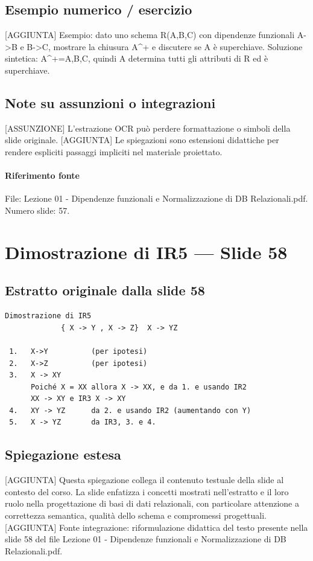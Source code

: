 \documentclass[11pt]{article}
\begin{document}
\subsection*{Esempio numerico / esercizio}
[AGGIUNTA] Esempio: dato uno schema R(A,B,C) con dipendenze funzionali A->B e B->C, mostrare la chiusura A^+ e discutere se A è superchiave. Soluzione sintetica: A^+={A,B,C}, quindi A determina tutti gli attributi di R ed è superchiave.
\subsection*{Note su assunzioni o integrazioni}
[ASSUNZIONE] L'estrazione OCR può perdere formattazione o simboli della slide originale.
[AGGIUNTA] Le spiegazioni sono estensioni didattiche per rendere espliciti passaggi impliciti nel materiale proiettato.
\paragraph{Riferimento fonte} File: Lezione 01 - Dipendenze funzionali e Normalizzazione di DB Relazionali.pdf. Numero slide: 57.
\section{Dimostrazione di IR5 --- Slide 58}
\subsection*{Estratto originale dalla slide 58}
\begin{lstlisting}
Dimostrazione di IR5
             { X -> Y , X -> Z}  X -> YZ

 1.   X->Y          (per ipotesi)
 2.   X->Z          (per ipotesi)
 3.   X -> XY
      Poiché X = XX allora X -> XX, e da 1. e usando IR2
      XX -> XY e IR3 X -> XY
 4.   XY -> YZ      da 2. e usando IR2 (aumentando con Y)
 5.   X -> YZ       da IR3, 3. e 4.
\end{lstlisting}
\subsection*{Spiegazione estesa}
[AGGIUNTA] Questa spiegazione collega il contenuto testuale della slide al contesto del corso. La slide enfatizza i concetti mostrati nell'estratto e il loro ruolo nella progettazione di basi di dati relazionali, con particolare attenzione a correttezza semantica, qualità dello schema e compromessi progettuali.
[AGGIUNTA] Fonte integrazione: riformulazione didattica del testo presente nella slide 58 del file Lezione 01 - Dipendenze funzionali e Normalizzazione di DB Relazionali.pdf.
\end{document}
